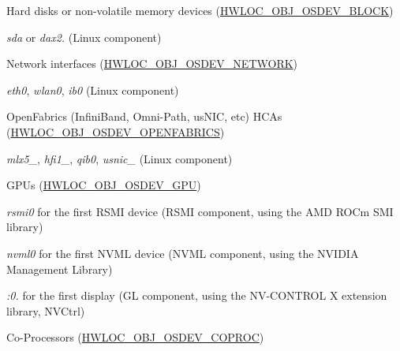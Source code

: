 \begin{DoxyItemize}
\item Hard disks or non-\/volatile memory devices (\hyperlink{a00184_gga64f5d539df299c97ae80ce53fc4b56c0a689b0488c3c0d08d116751c6b9cb8871}{H\+W\+L\+O\+C\+\_\+\+O\+B\+J\+\_\+\+O\+S\+D\+E\+V\+\_\+\+B\+L\+O\+CK}) 
\begin{DoxyItemize}
\item {\itshape sda} or {\itshape dax2.} (Linux component) 
\end{DoxyItemize}
\item Network interfaces (\hyperlink{a00184_gga64f5d539df299c97ae80ce53fc4b56c0ab715d81155f771573c8682dffc65021b}{H\+W\+L\+O\+C\+\_\+\+O\+B\+J\+\_\+\+O\+S\+D\+E\+V\+\_\+\+N\+E\+T\+W\+O\+RK}) 
\begin{DoxyItemize}
\item {\itshape eth0}, {\itshape wlan0}, {\itshape ib0} (Linux component) 
\end{DoxyItemize}
\item Open\+Fabrics (Infini\+Band, Omni-\/\+Path, us\+N\+IC, etc) H\+C\+As (\hyperlink{a00184_gga64f5d539df299c97ae80ce53fc4b56c0a52157d03694fdae82dddd57ca8c973b6}{H\+W\+L\+O\+C\+\_\+\+O\+B\+J\+\_\+\+O\+S\+D\+E\+V\+\_\+\+O\+P\+E\+N\+F\+A\+B\+R\+I\+CS}) 
\begin{DoxyItemize}
\item {\itshape mlx5\+\_}, {\itshape hfi1\+\_}, {\itshape qib0}, {\itshape usnic\+\_} (Linux component) 
\end{DoxyItemize}
\item G\+P\+Us (\hyperlink{a00184_gga64f5d539df299c97ae80ce53fc4b56c0aa3a09798ef2836abb236dc3a645ffc90}{H\+W\+L\+O\+C\+\_\+\+O\+B\+J\+\_\+\+O\+S\+D\+E\+V\+\_\+\+G\+PU}) 
\begin{DoxyItemize}
\item {\itshape rsmi0} for the first R\+S\+MI device (R\+S\+MI component, using the A\+MD R\+O\+Cm S\+MI library) 
\item {\itshape nvml0} for the first N\+V\+ML device (N\+V\+ML component, using the N\+V\+I\+D\+IA Management Library) 
\item {\itshape \+:0.} for the first display (GL component, using the N\+V-\/\+C\+O\+N\+T\+R\+OL X extension library, N\+V\+Ctrl) 
\end{DoxyItemize}
\item Co-\/\+Processors (\hyperlink{a00184_gga64f5d539df299c97ae80ce53fc4b56c0a46f8927e1c3e137eaa86cc8f6861fb83}{H\+W\+L\+O\+C\+\_\+\+O\+B\+J\+\_\+\+O\+S\+D\+E\+V\+\_\+\+C\+O\+P\+R\+OC}) 

\end{DoxyItemize}
